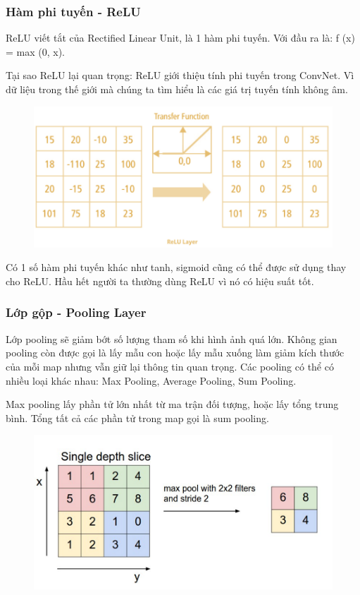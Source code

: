 \subsubsection{Hàm phi tuyến - ReLU}

ReLU viết tắt của Rectified Linear Unit, là 1 hàm phi tuyến. Với đầu ra là: ƒ (x) = max (0, x).

Tại sao ReLU lại quan trọng: ReLU giới thiệu tính phi tuyến trong ConvNet. Vì dữ liệu trong thế giới mà chúng ta tìm hiểu là các giá trị tuyến tính không âm.

\begin{figure}[H]  %
    \centering
    \includegraphics[width=0.75\linewidth]{Chapter2/RLU.png}
    \label{fig:baitoan}
\end{figure}

Có 1 số hàm phi tuyến khác như tanh, sigmoid cũng có thể được sử dụng thay cho ReLU. Hầu hết người ta thường dùng ReLU vì nó có hiệu suất tốt.

\subsubsection{Lớp gộp - Pooling Layer}

Lớp pooling sẽ giảm bớt số lượng tham số khi hình ảnh quá lớn. Không gian pooling còn được gọi là lấy mẫu con hoặc lấy mẫu xuống làm giảm kích thước của mỗi map nhưng vẫn giữ lại thông tin quan trọng. Các pooling có thể có nhiều loại khác nhau: Max Pooling, Average Pooling, Sum Pooling.

Max pooling lấy phần tử lớn nhất từ ma trận đối tượng, hoặc lấy tổng trung bình. Tổng tất cả các phần tử trong map gọi là sum pooling.

\begin{figure}[H]  %
    \centering
    \includegraphics[width=0.75\linewidth]{Chapter2/Pooling.png}
    \label{fig:baitoan}
\end{figure}

